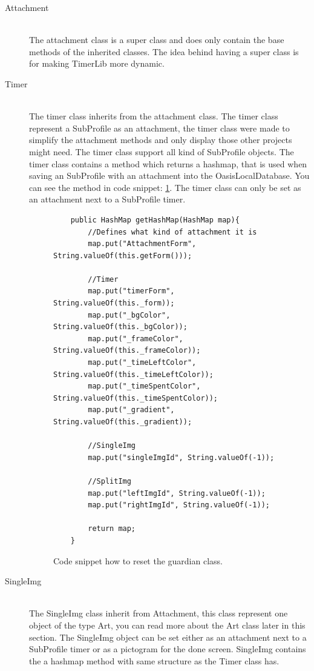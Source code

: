 \begin{description}
	\item[Attachment] \hfill \\
  The attachment class is a super class and does only contain the base methods of the inherited classes. The idea behind having a super class is for making TimerLib more dynamic.
	
  \item[Timer] \hfill \\
  The timer class inherits from the attachment class. The timer class represent a SubProfile as an attachment, the timer class were made to simplify the attachment methods and only display those other projects might need. The timer class support all kind of SubProfile objects. The timer class contains a method which returns a hashmap, that is used when saving an SubProfile with an attachment into the OasisLocalDatabase. You can see the method in code snippet: \ref{code:timerhash}. The timer class can only be set as an attachment next to a SubProfile timer.
	
		\begin{figure}[H]
\begin{lstlisting}
	public HashMap getHashMap(HashMap map){
		//Defines what kind of attachment it is
		map.put("AttachmentForm", String.valueOf(this.getForm()));
		
		//Timer
		map.put("timerForm", String.valueOf(this._form));
		map.put("_bgColor", String.valueOf(this._bgColor));
		map.put("_frameColor", String.valueOf(this._frameColor));
		map.put("_timeLeftColor", String.valueOf(this._timeLeftColor));
		map.put("_timeSpentColor", String.valueOf(this._timeSpentColor));
		map.put("_gradient", String.valueOf(this._gradient));
		
		//SingleImg
		map.put("singleImgId", String.valueOf(-1));
		
		//SplitImg
		map.put("leftImgId", String.valueOf(-1));
		map.put("rightImgId", String.valueOf(-1));
		
		return map;
	}
\end{lstlisting}
\caption{Code snippet how to reset the guardian class.}%
\label{code:timerhash}%
\end{figure}
	
  \item[SingleImg] \hfill \\
  The SingleImg class inherit from Attachment, this class represent one object of the type Art, you can read more about the Art class later in this section. The SingleImg object can be set either as an attachment next to a SubProfile timer or as a pictogram for the done screen. SingleImg contains the a hashmap method with same structure as the Timer class has.
	

\end{description}
